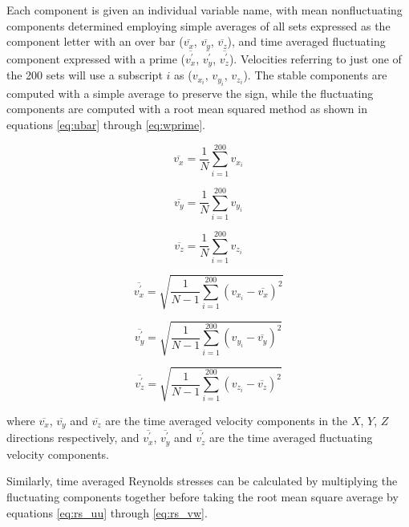 Each component is given an individual variable name, with mean nonfluctuating 
components determined employing simple averages of all sets expressed as the 
component letter with an over bar ($\overline{v_x}$, $\overline{v_y}$, 
$\overline{v_z}$), and 
time averaged fluctuating component expressed with a prime 
($\overline{v_x^\prime}$, $\overline{v_y^\prime}$, $\overline{v_z^\prime}$). 
Velocities referring to just one of the 200 sets will use a 
subscript $i$ as ($v_{x_i}$, $v_{y_i}$, $v_{z_i}$). The stable components are 
computed with 
a simple average to preserve the sign, while the fluctuating components are 
computed with a root mean squared method as shown in equations \ref{eq:ubar} 
through \ref{eq:wprime}.

\begin{equation}
\overline{v_x}  = \frac{1}{N} \sum_{i=1}^{200} v_{x_i}
\label{eq:ubar}
\end{equation}

\begin{equation}
\overline{v_y}  = \frac{1}{N} \sum_{i=1}^{200} v_{y_i}
\end{equation}

\begin{equation}
\overline{v_z}  = \frac{1}{N} \sum_{i=1}^{200} v_{z_i}
\end{equation}

\begin{equation}
\overline{v_x^\prime} = \sqrt{\frac{1}{N-1} \sum_{i=1}^{200} (v_{x_i} - 
\overline{v_x})^2}
\end{equation}

\begin{equation}
\overline{v_y^\prime} = \sqrt{\frac{1}{N-1} \sum_{i=1}^{200} (v_{y_i} - 
	\overline{v_y})^2}
\end{equation}

\begin{equation}
\overline{v_z^\prime} = \sqrt{\frac{1}{N-1} \sum_{i=1}^{200} (v_{z_i} - 
	\overline{v_z})^2}
\label{eq:wprime}
\end{equation}

where $\overline{v_x}$, $\overline{v_y}$ and $\overline{v_z}$ are the time 
averaged velocity 
components in the $X$, $Y$, $Z$ directions respectively, and  
$\overline{v_x^\prime}$, $\overline{v_y^\prime}$ and $\overline{v_z^\prime}$ 
are the time averaged fluctuating velocity components.

Similarly, time averaged Reynolds stresses can be calculated by multiplying the 
fluctuating components together before taking the root mean square average by 
equations \ref{eq:rs_uu} through \ref{eq:rs_vw}.


